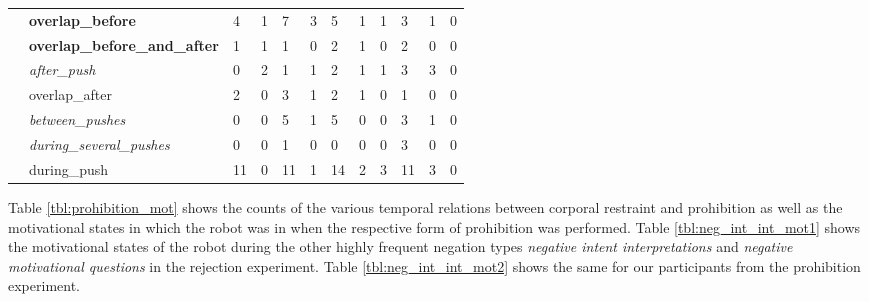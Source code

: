 \begin{table*}[h]
\begin{tabular*}{\hsize}{@{\extracolsep{\fill}}llllllllllll}
    & \textbf{overlap\_before} & 4 & 1 & 7 & 3 & 5 & 1 & 1 & 3 & 1 & 0\\
    & \textbf{overlap\_before\_and\_after} & 1 & 1 & 1 & 0 & 2 & 1 & 0 & 2 & 0 & 0\\
    & \textsl{after\_push} & 0 & 2 & 1 & 1 & 2 & 1 & 1 & 3 & 3 & 0\\
    & overlap\_after & 2 & 0 & 3 & 1 & 2 & 1 & 0 & 1 & 0 & 0\\
    & \textsl{between\_pushes} & 0 & 0 & 5 & 1 & 5 & 0 & 0 & 3 & 1 & 0\\
    & \textsl{during\_several\_pushes} & 0 & 0 & 1 & 0 & 0 & 0 & 0 & 3 & 0 & 0\\
    & during\_push & 11 & 0 & 11 & 1 & 14 & 2 & 3 & 11 & 3 & 0\\
    \bottomrule
  \end{tabular*}
\end{table*}
\noindent Table \ref{tbl:prohibition_mot} shows the counts of the various temporal relations between corporal restraint and prohibition as well as the motivational
states in which the robot was in when the respective form of prohibition was performed.
Table \ref{tbl:neg_int_int_mot1} shows the motivational states of the robot during the other highly frequent negation types \emph{negative intent interpretations}
and \emph{negative motivational questions} in the rejection experiment. Table \ref{tbl:neg_int_int_mot2} shows the same for our participants from the prohibition
experiment.

